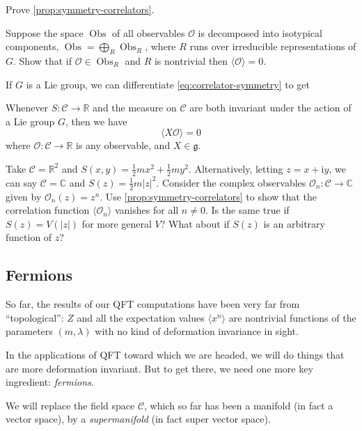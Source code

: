\documentclass[12pt,letterpaper,reqno]{article}
\numberwithin{equation}{section}
\newcommand{\fg}{{\mathfrak g}}
\newcommand{\cC}{\ensuremath{\mathcal C}}
\newcommand{\cO}{\ensuremath{\mathcal O}}
\newcommand{\R}{\ensuremath{\mathbb R}}
\newcommand{\C}{\ensuremath{\mathbb C}}
\newcommand{\half}{\ensuremath{\frac{1}{2}}}
\newcommand{\I}{{\mathrm i}}
\newcommand{\abs}[1]{\lvert#1\rvert}
\newcommand{\IP}[1]{\langle#1\rangle}
\newcommand{\ti}[1]{\textit{#1}}
\DeclareMathOperator{\Obs}{Obs}
\begin{document}
\begin{exercise} Prove \autoref{prop:symmetry-correlators}.
\end{exercise}

\begin{exercise}
Suppose the space $\Obs$ of all observables $\cO$ is decomposed
into isotypical components, $\Obs = \bigoplus_R \Obs_R$,
where $R$ runs over irreducible representations of $G$.
Show that if $\cO \in \Obs_R$ and $R$ is nontrivial
then $\IP{\cO} = 0$.
\end{exercise}

If $G$ is a Lie group, we can differentiate \eqref{eq:correlator-symmetry} 
to get
\begin{prop}
Whenever $S: \cC \to \R$ and the measure on $\cC$ are both 
invariant under the action of a Lie group $G$, then we have
\begin{equation}
  \IP{X \cO} = 0
\end{equation}
where $\cO: \cC \to \R$ is any observable, and $X \in \fg$.
\end{prop}

\begin{exercise}
Take $\cC = \R^2$ and $S(x,y) = \half m x^2 + \half m y^2$.
Alternatively, letting $z = x + \I y$, we can say $\cC = \C$
and $S(z) = \half m \abs{z}^2$.
Consider the complex observables $\cO_n: \cC \to \C$ given by
$\cO_n(z) = z^n$.
Use \autoref{prop:symmetry-correlators} to show that the correlation function
$\IP{\cO_n}$ vanishes for all $n \neq 0$. Is the same true if
$S(z) = V(\abs{z})$ for more general $V$? 
What about if $S(z)$ is an arbitrary function of $z$?
\end{exercise}

\subsection{Fermions}

So far, the results of our QFT computations have been very far from
``topological'': $Z$ and all the expectation values
$\IP{x^n}$ are nontrivial functions of the parameters $(m,\lambda)$
with no kind of deformation invariance in sight.

In the applications of QFT toward which we are headed, 
we will do things that are more deformation
invariant. But to get there, we need one more key ingredient: \ti{fermions}.

We will replace the field space $\cC$, which so far has been a manifold
(in fact a vector space), by a \ti{supermanifold} (in fact super vector
space).
\end{document}
